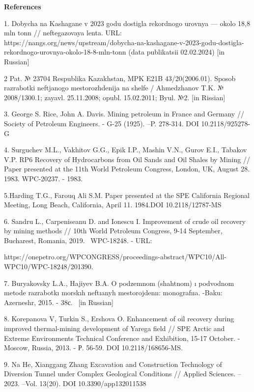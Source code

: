 \begin{center}
{\bfseries References}
\end{center}

\begin{noparindent}
1. Dobycha na Kashagane v 2023 godu dostigla rekordnogo urovnya ---
okolo 18,8 mln tonn // neftegazovaya lenta. URL:
https://nangs.org/news/upstream/dobycha-na-kashagane-v-2023-godu-dostigla-rekordnogo-urovnya-okolo-18-8-mln-tonn
(data publikatsii 02.02.2024) {[}in Russian{]}

2 Pat. № 23704 Respublika Kazakhstan, MPK E21B 43/20(2006.01). Sposob
razrabotki neftjanogo mestorozhdenija na shel\textquotesingle fe /
Ahmedzhanov T.K. № 2008/1300.1; zayavl. 25.11.2008; opubl. 15.02.2011;
Byul. №2. {[}in Rissian{]}

3. George S. Rice, John A. Davis. Mining petroleum in France and Germany
// Society of Petroleum Engineers. - G-25 (1925). --P. 278-314. DOI
10.2118/925278-G

4. Surguchev M.L., Vakhitov G.G., Epik I.P., Mashin V.N., Gurov E.I.,
Tabakov V.P. RP6 Recovery of Hydrocarbons from Oil Sands and Oil Shales
by Mining // Paper presented at the 11th World Petroleum Congress,
London, UK, August 28. 1983. WPC-20237. - 1983.

5.Harding T.G., Farouq Ali S.M. Paper presented at the SPE California
Regional Meeting, Long Beach, California, April 11. 1984.DOI
10.2118/12787-MS

6. Sandru L., Carpeniseanu D. and Ionescu I. Improvement of crude oil
recovery by mining methods // 10th World Petroleum Congress, 9-14
September, Bucharest, Romania, 2019. ~WPC-18248. - URL:

https://onepetro.org/WPCONGRESS/proceedings-abstract/WPC10/All-WPC10/WPC-18248/201390.

7. Buryakovsky L.A., Hajiyev B.A. O podzemnom (shahtnom) ı podvodnom
metode razrabotkı morskıh neftıanyh mestorojdenıı: monografııa. -Baku:
Azerneshr, 2015. - 38с. ~{[}in Russian{]}

8. Korepanova V, Turkin S., Ershova O. Enhancement of oil recovery
during improved thermal-mining development of Yarega field // SPE Arctic
and Extreme Environments Technical Conference and Exhibition, 15-17
October. - Moscow, Russia, 2013. - Р. 56-59. DOI 10.2118/168656-MS.

9. Na He, Xianggang Zhang Excavation and Construction Technology of
Diversion Tunnel under Complex Geological Conditions // Applied
Sciences. -- 2023. --Vol. 13(20). DOI 10.3390/app132011538


\end{noparindent}
